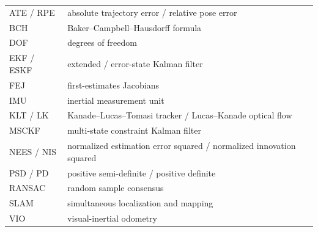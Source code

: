 \begin{center}\small
\begin{tabularx}{\textwidth}{@{}l X@{}}
\toprule
ATE / RPE & absolute trajectory error / relative pose error \\
BCH & Baker--Campbell--Hausdorff formula \\
DOF & degrees of freedom \\
EKF / ESKF & extended / error-state Kalman filter \\
FEJ & first-estimates Jacobians \\
IMU & inertial measurement unit \\
KLT / LK & Kanade--Lucas--Tomasi tracker / Lucas--Kanade optical flow \\
MSCKF & multi-state constraint Kalman filter \\
NEES / NIS & normalized estimation error squared / normalized innovation squared \\
PSD / PD & positive semi-definite / positive definite \\
RANSAC & random sample consensus \\
SLAM & simultaneous localization and mapping \\
VIO & visual-inertial odometry \\
\bottomrule
\end{tabularx}
\end{center}
